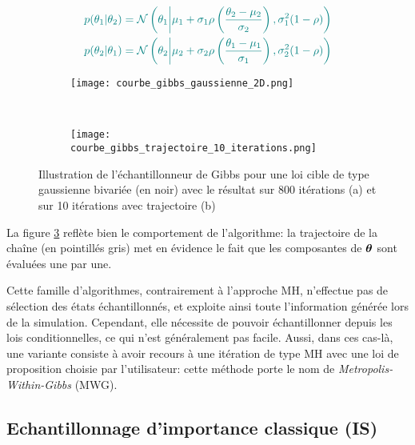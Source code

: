  \begin{equation}
 \NdFS{
 \label{eq_conditionnelles_gaussienne_bivariee}
 \begin{split}
 p(\theta_1 | \theta_2) &= \mathcal{N}\left(\theta_1 \middle\vert \mu_1 + \sigma_1 \corr\left(\dfrac{\theta_2 - \mu_2}{\sigma_2}\right), \sigma_1^2 (1-\corr)\right) \\
 p(\theta_2 | \theta_1) &= \mathcal{N}\left(\theta_2 \middle\vert \mu_2 + \sigma_2 \corr\left(\dfrac{\theta_1 - \mu_1}{\sigma_1}\right), \sigma_2^2 (1-\corr)\right)
 \end{split}
}
 \end{equation}
 
\begin{figure}[h!]
	\centering
	\begin{subfigure}[t]{0.5\textwidth}
		\centering
		\texttt{[image: courbe\_gibbs\_gaussienne\_2D.png]}
		\caption{}
		\label{subfig_gibbs_all}
	\end{subfigure}%
	~ 
	\begin{subfigure}[t]{0.5\textwidth}
		\centering
		\texttt{[image: courbe\_gibbs\_trajectoire\_10\_iterations.png]}
		\caption{}
		\label{subfig_gibbs_10}
	\end{subfigure}
	\caption{Illustration de l'échantillonneur de Gibbs pour une loi cible de type gaussienne bivariée (en noir) avec le résultat sur 800 itérations (a) et sur 10 itérations avec trajectoire (b)}
\end{figure}

La figure \ref{subfig_gibbs_10} reflète bien le comportement de l'algorithme: la trajectoire de la chaîne (en pointillés gris) met en évidence le fait que les composantes de ${\bm{\theta}}$ sont évaluées une par une. 

Cette famille d'algorithmes, contrairement à l'approche MH, n'effectue pas de sélection des états échantillonnés, et exploite ainsi toute l'information générée lors de la simulation. Cependant, elle nécessite de pouvoir échantillonner depuis les lois conditionnelles, ce qui n'est généralement pas facile. Aussi, dans ces cas-là, une variante consiste à avoir recours à une itération de type MH avec une loi de proposition choisie par l'utilisateur: cette méthode porte le nom de \textit{Metropolis-Within-Gibbs} (MWG).\\

 
 \subsection{Echantillonnage d'importance classique (IS)}
 
